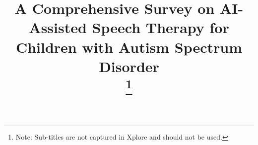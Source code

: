 \documentclass[conference]{IEEEtran}
\begin{document}
\title{A Comprehensive Survey on AI-Assisted Speech Therapy for Children with Autism Spectrum Disorder\\
{\footnotesize \textsuperscript{}}
\thanks{Note: Sub-titles are not captured in Xplore and should not be used.}
}

\newcommand{\authcol}[1]{%
  \begin{minipage}[t]{0.31\textwidth}\centering\small #1\end{minipage}}
\end{document}
